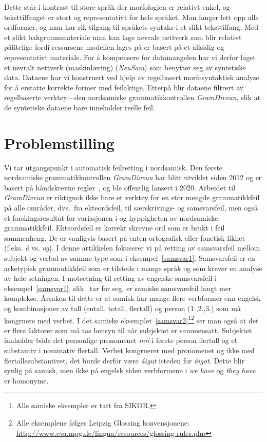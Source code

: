 \documentclass{flammie}
\begin{document}
Dette står i kontrast til store språk der morfologien er relativt enkel, og
teksttilfanget er stort og representativt for hele språket.  Man fanger lett opp
alle ordformer, og man har rik tilgang til språkets syntaks i et slikt
teksttilfang.  Med et slikt bakgrunnsmateriale man kan lage nevrale nettverk som
blir relativt pålitelige fordi ressursene modellen lages på er basert på et
allsidig og representativt materiale.  For å kompensere for datamangelen har vi
derfor laget et nevralt nettverk (maskinlæring) (\textit{NeuSam}) som benytter
seg av syntetiske data. Dataene har vi konstruert ved hjelp av regelbasert
morfosyntaktisk analyse for å erstatte korrekte former med feilaktige. Etterpå
blir dataene filtrert av regelbaserte verktøy---den nordsamiske
grammatikkontrollen \textit{GramDivvun}, slik at de syntetiske dataene bare
inneholder reelle feil.

\section{Problemstilling}

Vi tar utgangspunkt i automatisk feilretting i nordsamisk.  Den første
nordsamiske grammatikkontrollen \textit{GramDivvun} har blitt utviklet siden
2012 og er basert på håndskrevne regler~\cite{Wiechetek2012constraint}, og ble
offentlig lansert i 2020.  Arbeidet til \textit{GramDivvun} er riktignok ikke
bare et verktøy for en stor mengde grammatikkfeil på alle områder, dvs.\ fra
ekteordsfeil, til særskrivings- og samsvarsfeil, men også et forskingsresultat
for variasjonen i og hyppigheten av nordsamiske grammatikkfeil.  Ekteordsfeil er
korrekt skrevne ord som er brukt i feil sammenheng. De er vanligvis basert på
enten ortografisk eller fonetisk likhet (f.eks. \textit{å} vs. \textit{og}).  I
denne artikkelen fokuserer vi på retting av samsvarsfeil mellom subjekt og
verbal av samme type som i eksempel~\ref{samsvar1}.  Samsvarsfeil er en
arketypisk grammatikkfeil som er tilstede i mange språk og som krever en analyse
av hele setningen. I motsetning til retting av engelske samsvarsfeil i
eksempel~\ref{samsvar1}, slik~\cite{ng-etal-2013-conll} tar for seg, er samiske
samsvarsfeil langt mer komplekse.  Årsaken til dette er at samisk har mange
flere verbformer enn engelsk og kombinasjoner av tall (entall, totall, flertall)
og person (1.,2.,3.) som må kongruere med verbet. I det samiske
eksemplet~\ref{samsvar2}\footnote{Alle samiske eksempler er tatt fra
SIKOR.}\footnote{Alle eksemplene følger Leipzig Glossing konvensjonene:
\url{http://www.eva.mpg.de/lingua/resources/glossing-rules.php}} ser man også at
det er flere faktorer som må tas hensyn til når subjektet er sammensatt.
Subjektet innholder både det personlige pronomenet \textit{mii} i første person
flertall og et substantiv i nominativ flertall.  Verbet kongruerer med
pronomenet og ikke med flertallssubstantivet, det burde derfor være
\textit{áigut} isteden for \textit{áigot}. Dette blir synlig på samisk, men ikke
på engelsk siden verbformene i \textit{we have} og \textit{they have} er
homonyme.
\end{document}
